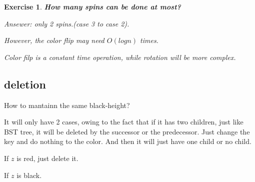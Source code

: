 \documentclass{article}
\newtheorem*{Exercise}{Exercise}
\begin{document}
\begin{Exercise}
    \textbf{How many spins can be done at most?}\par
    Ansewer: only 2 spins.(case 3 to case 2).\par
    However, the color flip may need $O(log n)$ times.\par
    Color filp is a constant time operation, while rotation will be more complex.
\end{Exercise}

\subsection{deletion}
How to mantainn the same black-height?\par
It will only have 2 cases, owing to the fact that if it has two children, just like BST tree, it will be deleted by the successor or the predecessor. Just change the key and do nothing to the color. And then it will just have one child or no child.\par
If $z$ is red, just delete it.\par
If $z$ is black.\par
\end{document}
